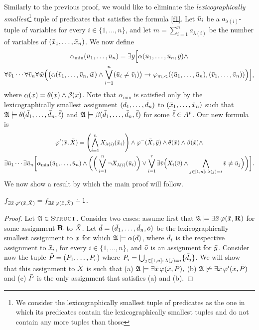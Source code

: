 \begin{enumerate}
	Similarly to the previous proof, we would like to eliminate the {\em lexicographically smallest}\footnote{We consider the lexicographically smallest tuple of predicates as the one in which its predicates contain the lexicographically smallest tuples and do not contain any more tuples than those} tuple of predicates that satisfies the formula \eqref{f1}. Let $\u_i$ be a $a_{\lambda(i)}$-tuple of variables for every $i \in \{1,\dots,n\}$, and let $m = \sum_{i = 1}^n a_{\lambda(i)}$ be the number of variables of $(\x_1,\dots,\x_n)$. We now define
	\begin{multline*}
	\alpha_{\min}(\u_1,\dots,\u_n) = \exists\y\Big[ \alpha(\u_1,\dots,\u_n,\y)\wedge \\ \forall\v_1\cdots\forall\v_n\forall\w\Big(\big(\alpha(\v_1,\dots,\v_n,\w)\wedge\bigvee_{i=1}^n(\u_i\neq\v_i)\big)\to \varphi_{m,<}((\u_1,\dots,\u_n),(\v_1,\dots,\v_n))\Big)\Big],
	\end{multline*}
	where $\alpha(\x) = \theta(\x) \wedge \beta(\x)$. Note that $\alpha_{\min}$ is satisfied only by the lexicographically \linebreak smallest assignment $(\d_1,\dots,\d_n)$ to $(\x_1,\dots,\x_n)$ such that $\A\models\theta(\d_1,\dots,\d_n,\l)$ and $\A\models\beta(\d_1,\dots,\d_n,\l)$ for some $\l \in A^p$. Our new formula is
	\begin{multline}
	\varphi^\prime(\x,\X) = \left( \bigwedge_{i=1}^n X_{\lambda(i)}(\x_i) \right) \wedge \varphi^{-}(\X,\y) \wedge \theta(\x) \wedge \beta(\x)\wedge \\ \exists\u_1\cdots\exists\u_n\bigg[\alpha_{\min}(\u_1,\dots,\u_n) \wedge \bigg(\bigg(\bigvee_{i = 1}^{n}\neg X_{\lambda(i)}(\u_i) \bigg) \vee \bigvee_{i=1}^r \exists \v\Big( X_i(\v) \wedge \bigwedge_{j\in[1,n]:\: \lambda(j) = i} \v \neq \u_j\Big) \bigg) \bigg].
	\end{multline}
	We now show a result by which the main proof will follow.
	\begin{lemma} \label{first}
		$f_{\exists \x \: \varphi^\prime(\x,\X)} = f_{\exists \x \: \varphi(\x,\X)} \dotminus 1$.
	\end{lemma}
	\begin{proof}
		Let $\A \in \str$. Consider two cases: assume first that $\A\models\exists\x\,\varphi(\x,\R)$ for some assignment $\R$ to $\X$. Let $\d = (\d_1,\dots,\d_n,\ep)$ be the lexicographically smallest assignment to $\x$ for which $\A\models\alpha(\d)$, where $\d_i$ is the respective assignment to $\x_i$, for every $i\in\{1,\dots,n\}$, and $\ep$ is an assignment for $\y$. Consider now the tuple $\P = (P_1,\dots,P_r)$ where $P_i = \bigcup_{j\in[1,n]:\:\lambda(j)=i}\{\d_j\}$. We will show that this assignment to $\X$ is such that (a) $\A\models\exists\x\,\varphi(\x,\P),$ (b) $\A\not\models\exists\x\,\varphi^\prime(\x,\P)$ and (c) $\P$ is the only assignment that satisfies (a) and (b).

\end{proof}
\end{enumerate}
